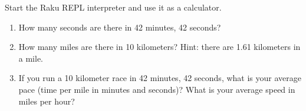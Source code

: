 \begin{exercise}

Start the Raku REPL interpreter and use it as a calculator.

\begin{enumerate}

\item How many seconds are there in 42 minutes, 42 seconds?

\item How many miles are there in 10 kilometers?  Hint: there are 1.61
  kilometers in a mile.

\item If you run a 10 kilometer race in 42 minutes, 42 seconds, what is
  your average pace (time per mile in minutes and seconds)?  What is
  your average speed in miles per hour?


\end{enumerate}

\end{exercise}


